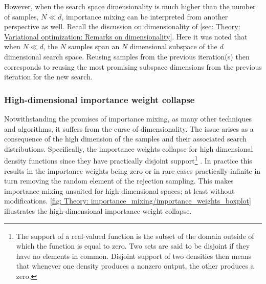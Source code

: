However, when the search space dimensionality is much higher than the number of samples, $N\ll d$, importance mixing can be interpreted from another perspective as well. Recall the discussion on dimensionality of \autoref{sec: Theory: Variational optimization: Remarks on dimensionality}. Here it was noted that when $N\ll d$, the $N$ samples span an $N$ dimensional subspace of the $d$ dimensional search space. Reusing samples from the previous iteration(s) then corresponds to reusing the most promising subspace dimensions from the previous iteration for the new search.


\subsubsection{High-dimensional importance weight collapse}
Notwithstanding the promises of importance mixing, as many other techniques and algorithms, it suffers from the curse of dimensionality. The issue arises as a consequence of the high dimension of the samples and their associated search distributions. Specifically, the importance weights collapse for high dimensional density functions since they have practically disjoint support\footnote{The support of a real-valued function is the subset of the domain outside of which the function is equal to zero\cite{Christensen2010}. Two sets are said to be disjoint if they have no elements in common. Disjoint support of two densities then means that whenever one density produces a nonzero output, the other produces a zero.} \cite{Bengtsson2008}. In practice this results in the importance weights being zero or in rare cases practically infinite in turn removing the random element of the rejection sampling. This makes importance mixing unsuited for high-dimensional spaces; at least without modifications. \autoref{fig: Theory: importance_mixing/importance_weights_boxplot} illustrates the high-dimensional importance weight collapse.

